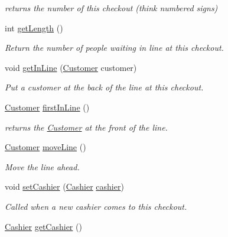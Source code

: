 \begin{CompactItemize}
\begin{CompactList}\small\item\em returns the number of this checkout (think numbered signs) \item\end{CompactList}\item 
int \hyperlink{class_checkout_ef70434478cfa2809da9b161751c522f}{getLength} ()
\begin{CompactList}\small\item\em Return the number of people waiting in line at this checkout. \item\end{CompactList}\item 
void \hyperlink{class_checkout_2e38f69374aaa88101b7acb54c326823}{getInLine} (\hyperlink{class_customer}{Customer} customer)
\begin{CompactList}\small\item\em Put a customer at the back of the line at this checkout. \item\end{CompactList}\item 
\hyperlink{class_customer}{Customer} \hyperlink{class_checkout_a54ef065c4835713f1352c7ae2441b26}{firstInLine} ()
\begin{CompactList}\small\item\em returns the \hyperlink{class_customer}{Customer} at the front of the line. \item\end{CompactList}\item 
\hyperlink{class_customer}{Customer} \hyperlink{class_checkout_d18d76d878a58d31583da42adc2c3777}{moveLine} ()
\begin{CompactList}\small\item\em Move the line ahead. \item\end{CompactList}\item 
void \hyperlink{class_checkout_1ebc3d36b7c8c4a55b86e70f6054c0b1}{setCashier} (\hyperlink{class_cashier}{Cashier} \hyperlink{class_checkout_5b3b71b8c2bbff1deb8481f7f29f0dbb}{cashier})
\begin{CompactList}\small\item\em Called when a new cashier comes to this checkout. \item\end{CompactList}\item 
\hypertarget{class_checkout_4d61b4e6ad5021613e6399f2acf89cff}{
\hyperlink{class_cashier}{Cashier} \hyperlink{class_checkout_4d61b4e6ad5021613e6399f2acf89cff}{getCashier} ()}
\label{class_checkout_4d61b4e6ad5021613e6399f2acf89cff}


\end{CompactItemize}
